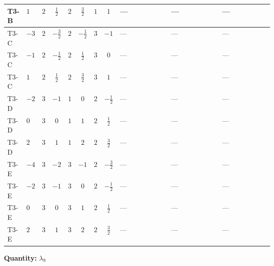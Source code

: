 \documentclass[8pt]{article}
\begin{document}
\begin{landscape}
\begin{longtable}{@{}llcccccc >{\raggedright\arraybackslash}p{0.21\linewidth} >{\raggedright\arraybackslash}p{0.21\linewidth} >{\raggedright\arraybackslash}p{0.21\linewidth}@{}}
\midrule
T3-B & $1$ & $2$ & $\frac{1}{2}$ & $2$ & $\frac{3}{2}$ & $1$ & $1$ & --- & --- & --- \\
\midrule
T3-C & $-3$ & $2$ & $-\frac{3}{2}$ & $2$ & $-\frac{1}{2}$ & $3$ & $-1$ & --- & --- & --- \\
\midrule
T3-C & $-1$ & $2$ & $-\frac{1}{2}$ & $2$ & $\frac{1}{2}$ & $3$ & $0$ & --- & --- & --- \\
\midrule
T3-C & $1$ & $2$ & $\frac{1}{2}$ & $2$ & $\frac{3}{2}$ & $3$ & $1$ & --- & --- & --- \\
\midrule
T3-D & $-2$ & $3$ & $-1$ & $1$ & $0$ & $2$ & $-\frac{1}{2}$ & --- & --- & --- \\
\midrule
T3-D & $0$ & $3$ & $0$ & $1$ & $1$ & $2$ & $\frac{1}{2}$ & --- & --- & --- \\
\midrule
T3-D & $2$ & $3$ & $1$ & $1$ & $2$ & $2$ & $\frac{3}{2}$ & --- & --- & --- \\
\midrule
T3-E & $-4$ & $3$ & $-2$ & $3$ & $-1$ & $2$ & $-\frac{3}{2}$ & --- & --- & --- \\
\midrule
T3-E & $-2$ & $3$ & $-1$ & $3$ & $0$ & $2$ & $-\frac{1}{2}$ & --- & --- & --- \\
\midrule
T3-E & $0$ & $3$ & $0$ & $3$ & $1$ & $2$ & $\frac{1}{2}$ & --- & --- & --- \\
\midrule
T3-E & $2$ & $3$ & $1$ & $3$ & $2$ & $2$ & $\frac{3}{2}$ & --- & --- & --- \\
\midrule
\bottomrule
\end{longtable}
\clearpage
\noindent\textbf{Quantity: }$\lambda_{9}$\par\smallskip

\end{landscape}
\end{document}
